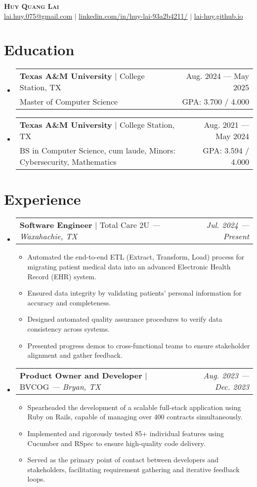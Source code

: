\documentclass[letterpaper,12pt]{article}
\makeatletter
\newcommand{\resumeItem}[1]{
  \item\small{
    {#1 \vspace{-2pt}}
  }
}
\newcommand{\resumeDegreeheading}[5]{
  \vspace{-2pt}\item
    \begin{tabular*}{0.97\textwidth}[t]{l@{\extracolsep{\fill}}r}
      \textbf{#1} $|$ #2 & #3 \\
      \small#4 & GPA: \small #5 / 4.000 \\
    \end{tabular*}\vspace{-7pt}
}
\newcommand{\resumeSubheading}[4]{
  \vspace{-2pt}\item
    \begin{tabular*}{0.97\textwidth}[t]{l@{\extracolsep{\fill}}r}
      \textbf{#1} $|$ #2 \textit{--- #3} & \textit{#4} \\
    \end{tabular*}\vspace{-7pt}
}
\newcommand{\resumeSubHeadingListStart}{\begin{itemize}[leftmargin=0pt, label={}]}
\newcommand{\resumeSubHeadingListEnd}{\end{itemize}}
\newcommand{\resumeItemListStart}{\begin{itemize}[leftmargin=10pt]}
\newcommand{\resumeItemListEnd}{\end{itemize}\vspace{-10pt}}
\makeatother
\begin{document}
\begin{center}
    \textbf{\Huge \scshape Huy Quang Lai} \\ \vspace{1pt}
    \small \href{mailto:lai.huy.075@gmail.com}{\underline{lai.huy.075@gmail.com}} $|$
    \href{https://www.linkedin.com/in/huy-lai-93a2b4211/}{\underline{linkedin.com/in/huy-lai-93a2b4211/}} $|$
    \href{https://lai-huy.github.io}{\underline{lai-huy.github.io}}
\end{center}


\vspace{-12pt}
\section{Education}
  \resumeSubHeadingListStart
    \resumeDegreeheading
      {Texas A\&M University}{College Station, TX}
      {Aug. 2024 --- May 2025}{Master of Computer Science}
      {3.700}
  
    \resumeDegreeheading
      {Texas A\&M University}{College Station, TX}
      {Aug. 2021 --- May 2024}{BS in Computer Science, cum laude, Minors: Cybersecurity, Mathematics}
      {3.594}
      
  \resumeSubHeadingListEnd

\vspace{-16pt}
\section{Experience}
  \resumeSubHeadingListStart
    \resumeSubheading
      {Software Engineer}{Total Care 2U}
      {Waxahachie, TX}{Jul. 2024 --- Present}
      \resumeItemListStart
        \resumeItem{Automated the end-to-end ETL (Extract, Transform, Load) process for migrating patient medical data into an advanced Electronic Health Record (EHR) system.}
        \resumeItem{Ensured data integrity by validating patients' personal information for accuracy and completeness.}
        \resumeItem{Designed automated quality assurance procedures to verify data consistency across systems.}
        \resumeItem{Presented progress demos to cross-functional teams to ensure stakeholder alignment and gather feedback.}
    \resumeItemListEnd

    \vspace{-10pt}
    \resumeSubheading
      {Product Owner and Developer}{BVCOG}
      {Bryan, TX}{Aug. 2023 --- Dec. 2023}
      \resumeItemListStart
        \resumeItem{Spearheaded the development of a scalable full-stack application using Ruby on Rails, capable of managing over 400 contracts simultaneously.}
        \resumeItem{Implemented and rigorously tested 85+ individual features using Cucumber and RSpec to ensure high-quality code delivery.}
        \resumeItem{Served as the primary point of contact between developers and stakeholders, facilitating requirement gathering and iterative feedback loops.}
      \resumeItemListEnd
  \resumeSubHeadingListEnd
\end{document}
